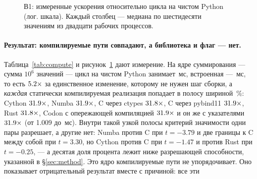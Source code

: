 \begin{figure}[t]
  \centering
  \caption{В1: измеренные ускорения относительно цикла на чистом Python (лог. шкала). Каждый
    столбец --- медиана по шестидесяти значениям  из двадцати рабочих процессов.}
  \label{fig:compute}
\end{figure}

\paragraph{Результат: компилируемые пути совпадают, а библиотека и флаг --- нет.}
Таблица~\ref{tab:compute} и рисунок~\ref{fig:compute} дают измерение. На ядре суммирования ---
сумма $10^6$ значений  --- цикл на чистом Python занимает \,мс, встроенная
 --- \,мс, то есть $\meas{ratio:b1_compute-314:arraysum/cpython_loop|b1_compute-314:arraysum/cpython_builtin_sum}{5.2}\times$ за единственное изменение, которому не нужен шаг
сборки, а \emph{каждая} статически компилируемая реализация попадает в полосу шириной \,\%: Cython $\meas{ratio:b1_compute-314:arraysum/cpython_loop|b1_compute-314:arraysum/cython}{31.9}\times$, Numba
$\meas{ratio:b1_compute-314:arraysum/cpython_loop|b1_compute-314:arraysum/numba}{31.9}\times$, C через ctypes $\meas{ratio:b1_compute-314:arraysum/cpython_loop|b1_compute-314:arraysum/c_ctypes}{31.8}\times$, C через pybind11 $\meas{ratio:b1_compute-314:arraysum/cpython_loop|b1_compute-314:arraysum/c_pybind11}{31.9}\times$, Rust $\meas{ratio:b1_compute-314:arraysum/cpython_loop|b1_compute-314:arraysum/rust_ctypes}{31.8}\times$, Codon с
опережающей компиляцией $\meas{ratio:b1_compute-314:arraysum/cpython_loop|b1_compute-314:arraysum/codon_pyext}{31.9}\times$ и он же с указателями $\meas{ratio:b1_compute-314:arraysum/cpython_loop|b1_compute-314:arraysum/codon_pyext_ptr}{31.9}\times$ (от 1.009 до \,мс). Внутри такой узкой полосы критерий значимости одни пары разрешает, а другие
нет: Numba против C при $t=-3.79$ и две границы к C между собой при $t=3.30$, но Cython против C
при $t=-1.47$ и против Rust при $t=-0.25$, --- а десятая доля процента лежит ниже разрешающей
способности, указанной в \S\ref{sec:method}. Это ядро компилируемые пути не упорядочивает.
Оно показывает отрицательный результат вместе с причиной: все эти
